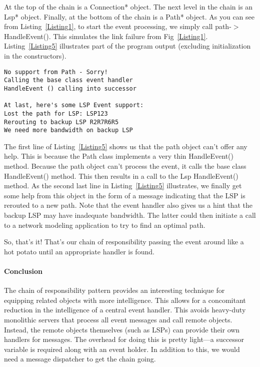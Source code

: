 \documentclass{book}
\begin{document}
At the top of the chain is a Connection* object. The next level in the chain is an Lsp* object. 
Finally, at the bottom of the chain is a Path* object. As you can see from Listing~\ref{Listing1}, to start the event processing, we simply call path-$>$HandleEvent().
This simulates the link failure from Fig~\ref{Listing1}. Listing~\ref{Listing5} illustrates part of the program output (excluding initialization in the constructors).
	
\begin{lstlisting}[caption={The program output},label={Listing5}]
No support from Path - Sorry!
Calling the base class event handler
HandleEvent () calling into successor
 
At last, here's some LSP Event support:
Lost the path for LSP: LSP123
Rerouting to backup LSP R2R7R6R5
We need more bandwidth on backup LSP
\end{lstlisting}

The first line of Listing~\ref{Listing5} shows us that the path object can't offer any help. This is because the Path class implements a very thin HandleEvent() method.
Because the path object can't process the event, it calls the base class HandleEvent() method. This then results in a call to the Lsp HandleEvent() method.
As the second last line in Listing~\ref{Listing5} illustrates, we finally get some help from this object in the form of a message indicating that the LSP is rerouted to a new path.
Note that the event handler also gives us a hint that the backup LSP may have inadequate bandwidth.
The latter could then initiate a call to a network modeling application to try to find an optimal path.

So, that's it! That's our chain of responsibility passing the event around like a hot potato until an appropriate handler is found. 

\paragraph{Conclusion}

The chain of responsibility pattern provides an interesting technique for equipping related objects with more intelligence.
This allows for a concomitant reduction in the intelligence of a central event handler.
This avoids heavy-duty monolithic servers that process all event messages and call remote objects.
Instead, the remote objects themselves (such as LSPs) can provide their own handlers for messages.
The overhead for doing this is pretty light—a successor variable is required along with an event holder.
In addition to this, we would need a message dispatcher to get the chain going.
\end{document}
